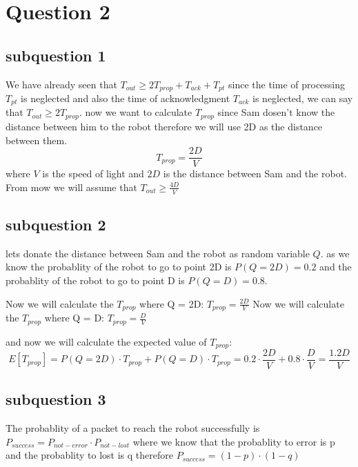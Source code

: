 \documentclass{article}
\begin{document}
    \section{Question 2}
    \subsection{subquestion 1}
    We have already seen that $T_{out} \geq 2T_{prop}+T_{ack}+T_{pt}$ since the time of processing $T_{pt}$ is neglected and also the time of acknowledgment $T_{ack}$ is neglected, we can say that $T_{out} \geq 2T_{prop}$.
    now we want to calculate $T_{prop }$ since Sam dosen't know the distance between him to the robot therefore we will use 2D as the distance between them. 
    \begin{equation}
        T_{prop} = \frac{2D}{V}
    \end{equation}
    where $V$ is the speed of light and $2D$ is the distance between Sam and the robot.\\



    From mow we will assume that $T_{out} \geq \frac{4D}{V} $
    \subsection{subquestion 2}
    lets donate the distance between Sam and the robot as random variable $Q$.
    as we know the probablity of the robot to go to point 2D is $P(Q=2D) = 0.2$ and the probablity of the robot to go to point D is $P(Q=D) = 0.8$.

    Now we will calculate the $T_{prop}$ where Q = 2D: $T_{prop} = \frac{2D}{V}$ 
    Now we will calculate the $T_{prop}$ where Q = D: $T_{prop} = \frac{D}{V}$ 

    and now we will calculate the expected value of $T_{prop}$:
    \begin{equation}
        E[T_{prop}] = P(Q=2D) \cdot T_{prop} + P(Q=D) \cdot T_{prop} = 0.2 \cdot \frac{2D}{V} + 0.8 \cdot \frac{D}{V} = \frac{1.2D}{V}
    \end{equation}

    \subsection{subquestion 3}
    The probablity of a packet to reach the robot successfully is $P_{success} =  P_{not-error} \cdot P_{not-lost}$ where we know that the probablity to error is p and the probablity to lost is q therefore $P_{success} = (1-p) \cdot (1-q)$
\end{document}
